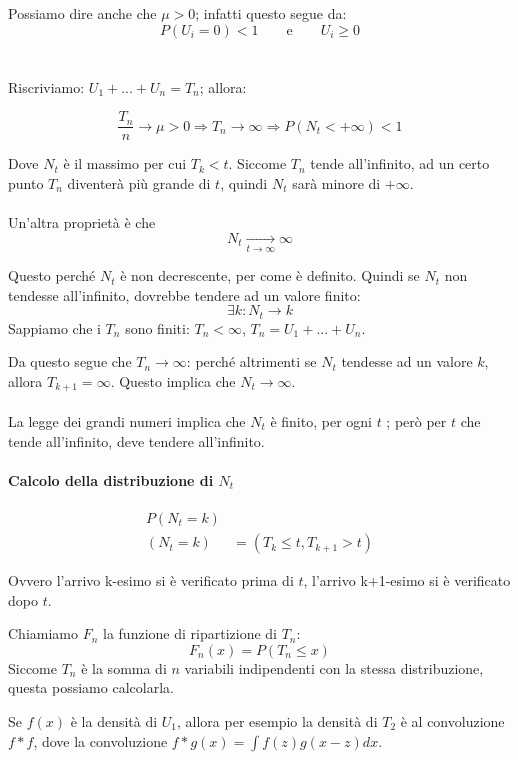 \documentclass[a4paper,12pt]{book}
\begin{document}
Possiamo dire anche che $ \mu > 0 $; infatti questo segue da:
$$ P(U_i = 0) < 1 \qquad \text{e} \qquad U_i \ge 0 $$
\\
\\
Riscriviamo: $ U_1 + ... + U_n = T_n $; allora:

$$ \frac{T_n}{n} \to \mu  > 0 \Rightarrow T_n \to \infty \Rightarrow P(N_t < +\infty) < 1 $$

Dove $ N_t $ è il massimo per cui $ T_k < t $. Siccome $ T_n $ tende all'infinito, ad un certo punto $ T_n $ diventerà più grande di $ t $, quindi $ N_t $ sarà minore di $ +\infty $.
\\
\\
Un'altra proprietà è che
$$ N_t \underset{t \to \infty}{\longrightarrow} \infty $$

Questo perché $ N_t $ è non decrescente, per come è definito. Quindi se $ N_t $ non tendesse all'infinito, dovrebbe tendere ad un valore finito:
$$ \exists k : N_t \to k $$
Sappiamo che i $ T_n $ sono finiti: $ T_n < \infty $, $ T_n = U_1 + ... + U_n $.

Da questo segue che $ T_n \to \infty $: perché altrimenti se $ N_t $ tendesse ad un valore $ k $, allora $ T_{k+1} = \infty $. Questo implica che $ N_t \to \infty$.
\\
\\
La legge dei grandi numeri implica che $ N_t $ è finito, per ogni $ t $ ; però per $ t $ che tende all'infinito, deve tendere all'infinito.

\paragraph{Calcolo della distribuzione di $ N_t $}

\begin{align*}
	P(N_t = k) & \\
	(N_t = k) & = (T_k \le t, T_{k+1} > t) 
\end{align*}

Ovvero l'arrivo k-esimo si è verificato prima di $ t $, l'arrivo k+1-esimo si è verificato dopo $ t $. 

Chiamiamo $ F_n $ la funzione di ripartizione di $ T_n $:
$$ F_n(x) = P(T_n \le x)$$
Siccome $ T_n $ è la somma di $ n $ variabili indipendenti con la stessa distribuzione, questa possiamo calcolarla.

Se $ f(x) $ è la densità di $ U_1 $, allora per esempio la densità di $ T_2 $ è al convoluzione $ f*f $, dove la convoluzione $ f *g(x)= \int f(z) g(x-z) dx $.
\end{document}
